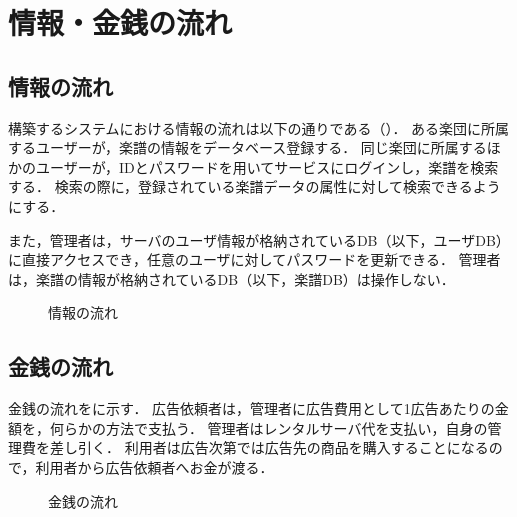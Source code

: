 \chapter{情報・金銭の流れ}
\section{情報の流れ}\label{sec:情報の流れ}
構築するシステムにおける情報の流れは以下の通りである（）．
ある楽団に所属するユーザーが，楽譜の情報をデータベース登録する．
同じ楽団に所属するほかのユーザーが，IDとパスワードを用いてサービスにログインし，楽譜を検索する．
検索の際に，登録されている楽譜データの属性に対して検索できるようにする．\par
また，管理者は，サーバのユーザ情報が格納されているDB（以下，ユーザDB）に直接アクセスでき，任意のユーザに対してパスワードを更新できる．
管理者は，楽譜の情報が格納されているDB（以下，楽譜DB）は操作しない．
\begin{figure}[h]
    \centering
    
    \caption{情報の流れ}
    \label{fig:情報の流れ}
\end{figure}
\section{金銭の流れ}\label{sec:金銭の流れ}
金銭の流れをに示す．
広告依頼者は，管理者に広告費用として1広告あたりの金額を，何らかの方法で支払う．
管理者はレンタルサーバ代を支払い，自身の管理費を差し引く．
利用者は広告次第では広告先の商品を購入することになるので，利用者から広告依頼者へお金が渡る．
\begin{figure}[h]
    \centering
    
    \caption{金銭の流れ}
    \label{fig:金銭の流れ}
\end{figure}

